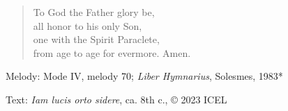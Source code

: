 \hymn



\setlength{\vleftmargin}{2em}
\begin{verse}
To God the Father glory be,\\
all honor to his only Son,\\
one with the Spirit Paraclete,\\
from age to age for evermore. Amen.
\end{verse}
\setlength{\vleftmargin}{\defleftmargini}

\begin{hymnsource}
Melody: Mode IV, melody 70; \emph{Liber Hymnarius}, Solesmes, 1983*

Text: \emph{Iam lucis orto sidere}, ca. 8th c., © 2023 ICEL
\end{hymnsource}
